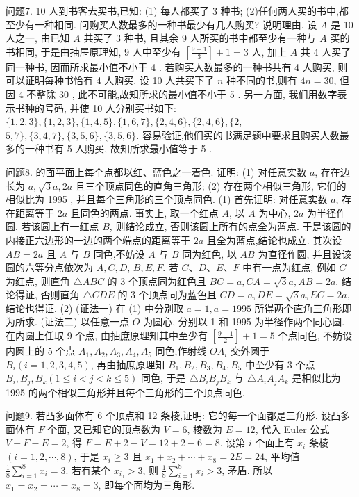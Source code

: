 问题7. 10 人到书客去买书,已知:
(1) 每人都买了 3 种书;
(2)任何两人买的书中,都至少有一种相同.
问购买人数最多的一种书最少有几人购买? 说明理由.
设 $A$ 是 10 人之一, 由已知 $A$ 共买了 3 种书, 且其余 9 人所买的书中都至少有一种与 $A$ 买的书相同, 于是由抽屉原理知, 9 人中至少有 $\left[\frac{9-1}{3}\right]+ 1=3$ 人, 加上 $A$ 共 4 人买了同一种书, 因而所求最小值不小于 4 . 若购买人数最多的一种书共有 4 人购买, 则可以证明每种书恰有 4 人购买.
设 10 人共买下了 $n$ 种不同的书,则有 $4 n=30$, 但因 4 不整除 30 , 此不可能,故知所求的最小值不小于 5 . 另一方面, 我们用数字表示书种的号码, 并使 10 人分别买书如下: $\{1,2,3\},\{1,2,3\},\{1,4,5\},\{1,6,7\},\{2,4,6\},\{2,4,6\},\{2$, $5,7\},\{3,4,7\},\{3,5,6\},\{3,5,6\}$. 容易验证,他们买的书满足题中要求且购买人数最多的一种书有 5 人购买, 故知所求最小值等于 5 .



问题8. 的面平面上每个点都以红、蓝色之一着色.
证明: (1) 对任意实数 $a$, 存在边长为 $a, \sqrt{3} a, 2 a$ 且三个顶点同色的直角三角形; (2) 存在两个相似三角形, 它们的相似比为 1995 , 并且每个三角形的三个顶点同色.
(1) 首先证明: 对任意实数 $a$, 存在距离等于 $2 a$ 且同色的两点.
事实上, 取一个红点 $A$, 以 $A$ 为中心, $2 a$ 为半径作圆.
若该圆上有一红点 $B$, 则结论成立, 否则该圆上所有的点全为蓝点.
于是该圆的内接正六边形的一边的两个端点的距离等于 $2 a$ 且全为蓝点,结论也成立.
其次设 $A B=2 a$ 且 $A$ 与 $B$ 同色,不妨设 $A$ 与 $B$ 同为红色, 以 $A B$ 为直径作圆, 并且设该圆的六等分点依次为 $A, C, D$, $B, E, F$. 若 $C 、 D 、 E 、 F$ 中有一点为红点, 例如 $C$ 为红点, 则直角 $\triangle A B C$ 的 3 个顶点同为红色且 $B C=a, C A=\sqrt{3} a, A B=2 a$. 结论得证, 否则直角 $\triangle C D E$ 的 3 个顶点同为蓝色且 $C D=a, D E=\sqrt{3} a, E C=2 a$, 结论也得证.
(2) (证法一) 在 (1) 中分别取 $a=1, a=1995$ 所得两个直角三角形即为所求.
(证法二) 以任意一点 $O$ 为圆心, 分别以 1 和 1995 为半径作两个同心圆.
在内圆上任取 9 个点, 由抽庶原理知其中至少有 $\left[\frac{9-1}{2}\right]+1=5$ 个点同色, 不妨设内圆上的 5 个点 $A_1, A_2, A_3, A_4, A_5$ 同色,作射线 $O A_i$ 交外圆于 $B_i(i=1,2,3,4,5)$, 再由抽庶原理知 $B_1, B_2, B_3, B_4, B_5$ 中至少有 3 个点 $B_i, B_j, B_k(1 \leqslant i<j<k \leqslant 5)$ 同色, 于是 $\triangle B_i B_j B_k$ 与 $\triangle A_i A_j A_k$ 是相似比为 1995 的两个相似三角形并且每个三角形的三个顶点同色.



问题9. 若凸多面体有 6 个顶点和 12 条棱,证明: 它的每一个面都是三角形.
设凸多面体有 $F$ 个面, 又已知它的顶点数为 $V=6$, 棱数为 $E=12$, 代入 Euler 公式 $V+F-E=2$, 得 $F=E+2-V=12+2-6=8$. 设第 $i$ 个面上有 $x_i$ 条棱 $(i=1,2, \cdots, 8)$, 于是 $x_i \geqslant 3$ 且 $x_1+x_2+\cdots+x_8= 2 E=24$, 平均值 $\frac{1}{8} \sum_{i=1}^8 x_i=3$. 若有某个 $x_{i_0}>3$, 则 $\frac{1}{8} \sum_{i=1}^8 x_i>3$, 矛盾.
所以 $x_1=x_2=\cdots=x_8=3$, 即每个面均为三角形.



